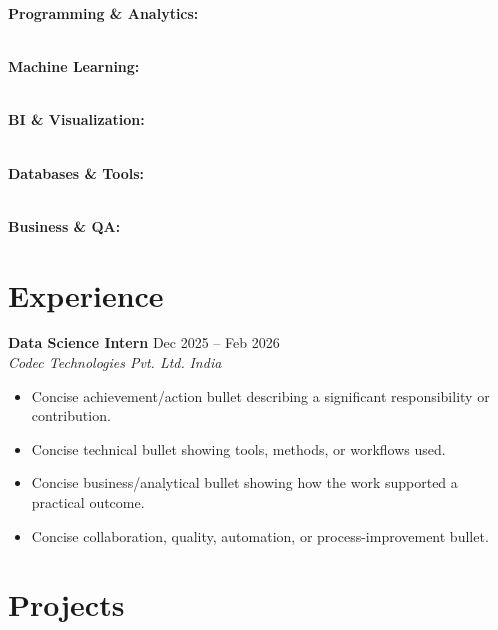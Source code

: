 \documentclass[a4paper,11pt]{article}
\newcommand{\resumeSubheading}[4]{
    \textbf{#1} \hfill #2 \\[1pt]
    \textit{#3} \hfill \textit{#4}
    \vspace{3pt}
}
\newcommand{\resumeItem}[1]{
    \item #1
}
\begin{document}
\textbf{Programming \& Analytics:}

\\[2pt]

\textbf{Machine Learning:}

\\[2pt]

\textbf{BI \& Visualization:}

\\[2pt]

\textbf{Databases \& Tools:}

\\[2pt]

\textbf{Business \& QA:}


\section*{Experience}
\vspace{0.04cm}

\resumeSubheading
{Data Science Intern}{Dec 2025 -- Feb 2026}
{Codec Technologies Pvt. Ltd.}{India}

\begin{itemize}
    \resumeItem{Concise achievement/action bullet describing a significant responsibility or contribution.}
    \resumeItem{Concise technical bullet showing tools, methods, or workflows used.}
    \resumeItem{Concise business/analytical bullet showing how the work supported a practical outcome.}
    \resumeItem{Concise collaboration, quality, automation, or process-improvement bullet.}
\end{itemize}


\section*{Projects}
\vspace{0.04cm}
\end{document}
